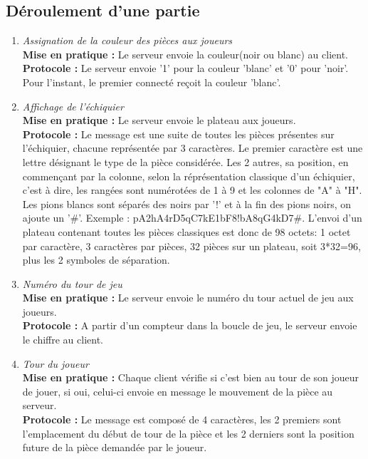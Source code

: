 \documentclass[10pt, a4paper]{article}
\begin{document}
\subsection{Déroulement d'une partie}
\begin{enumerate}

\item \textit{Assignation de la couleur des pièces aux joueurs} \\
\textbf{Mise en pratique :} Le serveur envoie la couleur(noir ou blanc) au client. \\
\textbf{Protocole :} Le serveur envoie '1' pour la couleur 'blanc' et '0' pour 'noir'. Pour l'instant, le premier connecté reçoit la couleur 'blanc'.  

\item \textit{Affichage de l'échiquier} \\
\textbf{Mise en pratique :} Le serveur envoie le plateau aux joueurs. \\
\textbf{Protocole :} Le message est une suite de toutes les pièces présentes sur l'échiquier, chacune représentée par 3 caractères. Le premier caractère est une lettre désignant le type de la pièce considérée. Les 2 autres, sa position, en commençant par la colonne, selon la réprésentation classique d'un échiquier, c'est à dire, les rangées sont numérotées de 1 à 9 et les colonnes de "A" à "H". Les pions blancs sont séparés des noirs par '!' et à la fin des pions noirs, on ajoute un '\#'. Exemple : pA2hA4rD5qC7kE1bF8!bA8qG4kD7\#. L'envoi d'un plateau contenant toutes les pièces classiques est donc de 98 octets: 1 octet par caractère, 3 caractères par pièces, 32 pièces sur un plateau, soit 3*32=96, plus les 2 symboles de séparation.   

\item \textit{Numéro du tour de jeu} \\
\textbf{Mise en pratique :} Le serveur envoie le numéro du tour actuel de jeu aux joueurs.  \\
\textbf{Protocole :} A partir d'un compteur dans la boucle de jeu, le serveur envoie le chiffre au client.  

\item \textit{Tour du joueur} \\
\textbf{Mise en pratique :} Chaque client vérifie si c'est bien au tour de son joueur de jouer, si oui, celui-ci envoie en message le mouvement de la pièce au serveur. \\
\textbf{Protocole :} Le message est composé de 4 caractères, les 2 premiers sont l'emplacement du début de tour de la pièce et les 2 derniers sont la position future de la pièce demandée par le joueur.


\end{enumerate}
\end{document}
